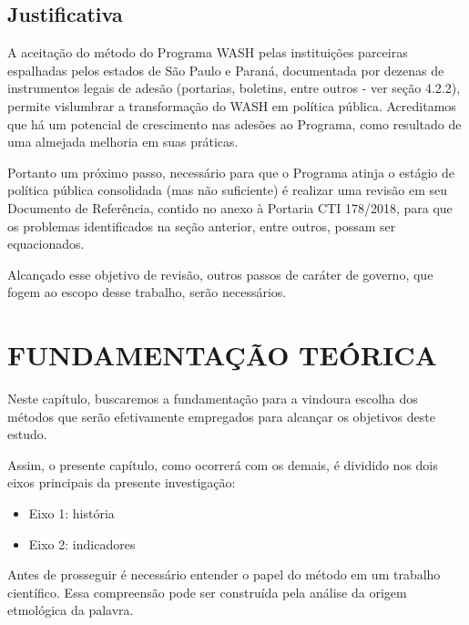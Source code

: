 \section[Justificativa]{Justificativa}\label{Justificativa}
A aceitação do método do Programa WASH pelas instituições parceiras espalhadas pelos estados de São Paulo e Paraná, documentada por dezenas de instrumentos legais de adesão (portarias, boletins, entre outros - ver seção 4.2.2), permite vislumbrar a transformação do WASH em política pública. Acreditamos que há um potencial de crescimento nas adesões ao Programa, como resultado de uma almejada melhoria em suas práticas.

Portanto um próximo passo, necessário para que o Programa atinja o estágio de política pública consolidada (mas não suficiente) é realizar uma revisão em seu Documento de Referência, contido no anexo à Portaria CTI 178/2018, para que os problemas identificados na seção anterior, entre outros, possam ser equacionados.

Alcançado esse objetivo de revisão, outros passos de caráter de governo, que fogem ao escopo desse trabalho, serão necessários.

\chapter[FUNDAMENTAÇÃO TEÓRICA]{FUNDAMENTAÇÃO TEÓRICA}\label{FUNDAMENTAÇÃO TEÓRICA}
Neste capítulo, buscaremos a fundamentação para a vindoura escolha dos métodos que serão efetivamente empregados para alcançar os objetivos deste estudo.

Assim, o presente capítulo, como ocorrerá com os demais, é dividido nos dois eixos principais da presente investigação:


\begin{itemize}
\item Eixo 1: história
\item Eixo 2: indicadores
\end{itemize}

Antes de prosseguir é necessário entender o papel do método em um trabalho científico. Essa compreensão pode ser construída pela análise da origem etmológica da palavra.


\noindent\begin{flushright}\mbox{\linespread{1}\selectfont\centering{}}\end{flushright}


